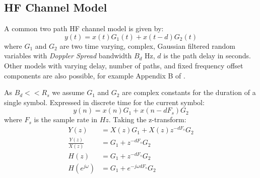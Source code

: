 \documentclass{article}
\begin{document}
\subsection{HF Channel Model}

A common two path HF channel model \cite{itu1487} is given by:
\begin{equation}
y(t) = x(t)G_1(t) + x(t-d)G_2(t)
\end{equation}
where $G_1$ and $G_2$ are two time varying, complex, Gaussian filtered random variables with \emph{Doppler Spread} bandwidth $B_d$ Hz, $d$ is the path delay in seconds. Other models with varying delay, number of paths, and fixed frequency offset components are also possible, for example Appendix B of \cite{etsi201}.

As $B_d<< R_s$ we assume $G_1$ and $G_2$ are complex constants for the duration of a single symbol. Expressed in discrete time for the current symbol:
\begin{equation}
\label{eq:hf_model_time}
y(n) = x(n)G_1 + x(n-dF_s)G_2
\end{equation}
where $F_s$ is the sample rate in $\si{Hz}$.  Taking the z-transform:
\begin{equation}
\label{eq:hf_model_freq}
\begin{split}
Y(z) &= X(z)G_1+X(z)z^{-dF_s}G_2 \\
\frac{Y(z)}{X(z)} &= G_1+z^{-dF_s}G_2 \\
H(z) &= G_1+z^{-dF_s}G_2 \\
H(e^{j \omega}) &= G_1+e^{-j \omega d F_s}G_2
\end{split}
\end{equation}
\end{document}
